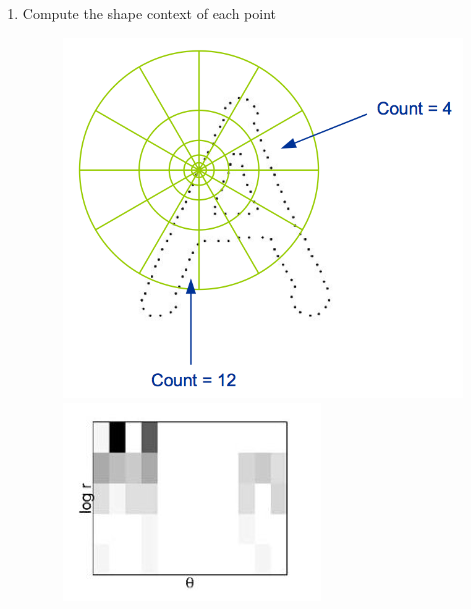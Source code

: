 \documentclass[notheorems,serif,table,compress]{beamer}  %
\begin{document}
\begin{frame}
\begin{enumerate}
    \pause
        \item Compute the shape context of each point
            \begin{figure}
              \centering
              \begin{minipage}[t]{0.3\linewidth}
              \includegraphics[width=1\linewidth]{a-log}
              \end{minipage}
              \begin{minipage}[t]{0.3\linewidth}
              \centering
              \includegraphics[width=1\linewidth]{his}
              \end{minipage}
            \end{figure}
       \end{enumerate}
\end{frame}
\end{document}
